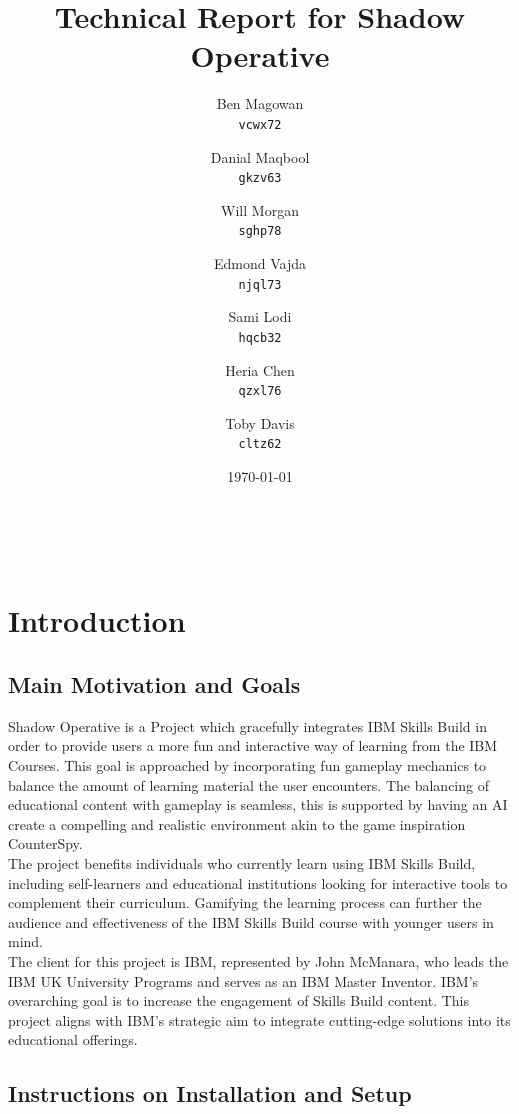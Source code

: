 \documentclass[11pt, a4paper]{article}
\title{Technical Report for Shadow Operative}
\date{\today}
\author{
    Ben Magowan \\
    \texttt{vcwx72}
    \and
    Danial Maqbool \\
    \texttt{gkzv63}
    \and
    Will Morgan \\
    \texttt{sghp78}
    \and
    Edmond Vajda \\
    \texttt{njql73} \\
    \and
    Sami Lodi \\
    \texttt{hqcb32}
    \and
    Heria Chen \\
    \texttt{qzxl76}
    \and
    Toby Davis \\
    \texttt{cltz62}
}
\begin{document}
\maketitle

\begin{center}
     \\
\end{center}

\newpage

\tableofcontents

\section{Introduction}

\subsection{Main Motivation and Goals}

\noindent Shadow Operative is a Project which gracefully integrates IBM Skills Build in order to provide users a more fun and interactive way of learning from the IBM Courses. This goal is approached by incorporating fun gameplay mechanics to balance the amount of learning material the user encounters. The balancing of educational content with gameplay is seamless, this is supported by having an AI create a compelling and realistic environment akin to the game inspiration CounterSpy. \\

\noindent The project benefits individuals who currently learn using IBM Skills Build, including self-learners and educational institutions looking for interactive tools to complement their curriculum. Gamifying the learning process can further the audience and effectiveness of the IBM Skills Build course with younger users in mind. \\

\noindent The client for this project is IBM, represented by John McManara, who leads the IBM UK University Programs and serves as an IBM Master Inventor. IBM’s overarching goal is to increase the engagement of Skills Build content. This project aligns with IBM’s strategic aim to integrate cutting-edge solutions into its educational offerings.

\subsection{Instructions on Installation and Setup}
\end{document}
